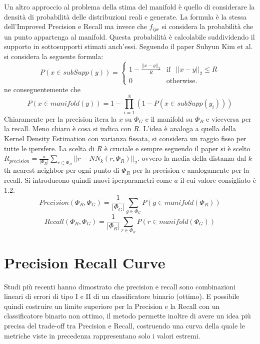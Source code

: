 Un altro approccio al problema della stima del manifold è quello di considerare la densità di probabilità delle distribuzioni reali e generate. La formula è la stessa dell'Improved Precision e Recall ma invece che $f_{ipr}$ si considera la probabilità che un punto appartenga al manifold.
Questa probabilità è calcolabile suddividendo il supporto in sottosupporti stimati anch'essi. Seguendo il paper Suhyun Kim et al. \cite{kim2020probabilistic} si considera la seguente formula:
\begin{equation}
    P(x \in subSupp(y)) = 
    \begin{cases}
        1 - \frac{|| x - y ||_2}{R} & \text{if }~~  || x - y ||_2 \leq R \\
        0 & \text{otherwise.} 
    \end{cases}
\end{equation}
ne conseguentemente che
\begin{equation}
    P(x \in manifold(y)) = 1 - \prod_{i=1}^{N} (1 - P(x \in subSupp(y_i)))
\end{equation}
Chiaramente per la precision itera la $x$ su $\Phi_G$ e il manifold su $\Phi_R$ e viceversa per la recall. Meno chiaro è cosa si indica con $R$. L'idea è analoga a quella della Kernel Density Estimation con varianza fissata, si considera un raggio fisso per tutte le ipersfere.
La scelta di $R$ è cruciale e sempre seguendo il paper si è scelto $R_{precision} = \frac{a}{|\Phi_R|} \sum_{r \in \Phi_R} ||r - NN_k(r, \Phi_R)||_2$. ovvero la media della distanza dal $k$-th nearest neighbor per ogni punto di $\Phi_R$ per la precision e analogamente per la recall.
Si introducono quindi nuovi iperparametri come $a$ il cui valore consigliato è 1.2.
\begin{equation}
    Precision(\Phi_R, \Phi_G) = \frac{1}{|\Phi_G|} \sum_{g \in \Phi_G} P(g \in manifold(\Phi_R))
\end{equation}
\begin{equation}
    Recall(\Phi_R, \Phi_G) = \frac{1}{|\Phi_R|} \sum_{r \in \Phi_R} P(r \in manifold(\Phi_G))
\end{equation}

\section{Precision Recall Curve}
\label{sec:precision-recall-curve}

Studi più recenti hanno dimostrato che precision e recall sono combinazioni lineari di errori di tipo I e II di un classificatore binario (ottimo). E possibile quindi costruire un limite superiore per la Precision e la Recall con un classificatore binario non ottimo, il metodo permette inoltre
di avere un idea più precisa del trade-off tra Precision e Recall, costruendo una curva della quale le metriche viste in precedenza rappresentano solo i valori estremi.

